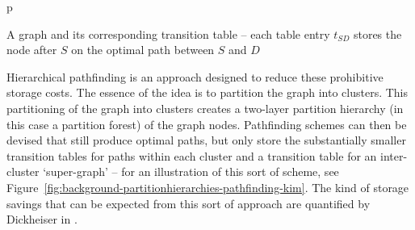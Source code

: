 \begin{stusubfig}{p}
	\hspace{4mm}%
\caption{A graph and its corresponding transition table -- each table entry $t_{SD}$ stores the node after $S$ on the optimal path between $S$ and $D$}
\label{fig:background-partitionhierarchies-pathfinding-transitiontable}
\end{stusubfig}

Hierarchical pathfinding is an approach designed to reduce these prohibitive storage costs. The essence of the idea is to partition the graph into clusters. This partitioning of the graph into clusters creates a two-layer partition hierarchy (in this case a partition forest) of the graph nodes. Pathfinding schemes can then be devised that still produce optimal paths, but only store the substantially smaller transition tables for paths within each cluster and a transition table for an inter-cluster `super-graph' -- for an illustration of this sort of scheme, see Figure~\ref{fig:background-partitionhierarchies-pathfinding-kim}. The kind of storage savings that can be expected from this sort of approach are quantified by Dickheiser in \cite{dickheiser04}.

